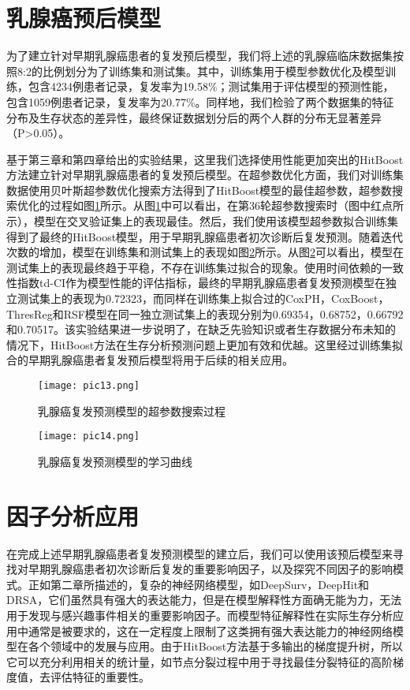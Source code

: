 \section{乳腺癌预后模型}
为了建立针对早期乳腺癌患者的复发预后模型，我们将上述的乳腺癌临床数据集按照8:2的比例划分为了训练集和测试集。其中，训练集用于模型参数优化及模型训练，包含4234例患者记录，复发率为19.58\%；测试集用于评估模型的预测性能，包含1059例患者记录，复发率为20.77\%。同样地，我们检验了两个数据集的特征分布及生存状态的差异性，最终保证数据划分后的两个人群的分布无显著差异（P>0.05）。

基于第三章和第四章给出的实验结果，这里我们选择使用性能更加突出的HitBoost方法建立针对早期乳腺癌患者的复发预后模型。在超参数优化方面，我们对训练集数据使用贝叶斯超参数优化搜索方法得到了HitBoost模型的最佳超参数，超参数搜索优化的过程如图\ref{pic13}所示。从图\ref{pic13}中可以看出，在第36轮超参数搜索时（图中红点所示），模型在交叉验证集上的表现最佳。然后，我们使用该模型超参数拟合训练集得到了最终的HitBoost模型，用于早期乳腺癌患者初次诊断后复发预测。随着迭代次数的增加，模型在训练集和测试集上的表现如图\ref{pic14}所示。从图\ref{pic14}可以看出，模型在测试集上的表现最终趋于平稳，不存在训练集过拟合的现象。使用时间依赖的一致性指数td-CI作为模型性能的评估指标，最终的早期乳腺癌患者复发预测模型在独立测试集上的表现为0.72323，而同样在训练集上拟合过的CoxPH，CoxBoost，ThresReg和RSF模型在同一独立测试集上的表现分别为0.69354，0.68752，0.66792和0.70517。该实验结果进一步说明了，在缺乏先验知识或者生存数据分布未知的情况下，HitBoost方法在生存分析预测问题上更加有效和优越。这里经过训练集拟合的早期乳腺癌患者复发预后模型将用于后续的相关应用。

\begin{figure}[H]
\texttt{[image: pic13.png]}
\caption{乳腺癌复发预测模型的超参数搜索过程}
\label{pic13}
\end{figure}

\begin{figure}[H]
\texttt{[image: pic14.png]}
\caption{乳腺癌复发预测模型的学习曲线}
\label{pic14}
\end{figure}

\section{因子分析应用}
在完成上述早期乳腺癌患者复发预测模型的建立后，我们可以使用该预后模型来寻找对早期乳腺癌患者初次诊断后复发的重要影响因子，以及探究不同因子的影响模式。正如第二章所描述的，复杂的神经网络模型，如DeepSurv，DeepHit和DRSA，它们虽然具有强大的表达能力，但是在模型解释性方面确无能为力，无法用于发现与感兴趣事件相关的重要影响因子。而模型特征解释性在实际生存分析应用中通常是被要求的，这在一定程度上限制了这类拥有强大表达能力的神经网络模型在各个领域中的发展与应用。由于HitBoost方法基于多输出的梯度提升树，所以它可以充分利用相关的统计量，如节点分裂过程中用于寻找最佳分裂特征的高阶梯度值，去评估特征的重要性。


